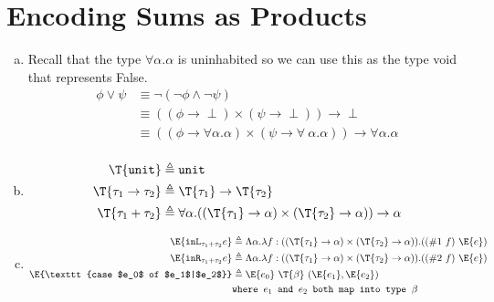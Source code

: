\section{Encoding Sums as Products}
\begin{enumerate}[(a)]
  \item
  Recall that the type $\forall\alpha.\alpha$ is uninhabited so we can use this as the type void that represents False.
  \begin{align*}
  \phi \vee \psi &\equiv \neg (\neg \phi \wedge \neg \psi)\\
                 &\equiv ((\phi \rightarrow \perp) \times (\psi \rightarrow \perp)) \rightarrow \perp\\
                 &\equiv ((\phi \rightarrow \forall \alpha.\alpha) \times (\psi \rightarrow \forall ~\alpha.\alpha)) \rightarrow \forall \alpha.\alpha\\
  \end{align*}
   \item
   \begin{align*}
    \T {\texttt{unit}} &\triangleq \texttt{unit}\\
    \T {\tau_1 \rightarrow \tau_2} &\triangleq \T {\tau_1} \rightarrow \T {\tau_2}\\
    \T {\tau_1 + \tau_2} &\triangleq \forall\alpha.((\T {\tau_1} \rightarrow \alpha) \times (\T {\tau_2} \rightarrow \alpha)) \rightarrow \alpha
   \end{align*}
   \item
   \begin{align*}
    \E {\texttt{inL}_{\tau_1 + \tau_2}e} &\triangleq \Lambda \alpha.\lambda f : ((\T {\tau_1} \rightarrow \alpha) \times (\T {\tau_2} \rightarrow \alpha)). ((\#1~f)~\E{e})\\
    \E {\texttt{inR}_{\tau_1 + \tau_2}e} &\triangleq \Lambda \alpha.\lambda f : ((\T {\tau_1} \rightarrow \alpha) \times (\T {\tau_2} \rightarrow \alpha)). ((\#2~f)~\E{e})\\
    \E {\texttt{case $e_0$ of $e_1$|$e_2$}} &\triangleq \E {e_0}~\T {\beta}~(\E{e_1}, \E{e_2}) \\
    &\texttt{where $e_1$ and $e_2$ both map into type $\beta$}
   \end{align*}
\end{enumerate}